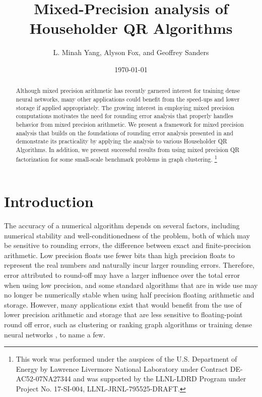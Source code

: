 \documentclass[review,onefignum,onetabnum]{siamart190516}
\title{Mixed-Precision analysis of Householder QR Algorithms}
\author{L. Minah Yang, Alyson Fox, and Geoffrey Sanders}
\date{\today}
\newcommand\blfootnote[1]{%
	\begingroup
	\renewcommand\thefootnote{}\footnote{#1}%
	\addtocounter{footnote}{-1}%
	\endgroup
}
\begin{document}
\maketitle
\begin{abstract}
	Although mixed precision arithmetic has recently garnered interest for training dense neural networks, many other applications could benefit from the  speed-ups and lower storage if applied appropriately. 
	The growing interest in employing mixed precision computations motivates the need for rounding error analysis that properly handles behavior from mixed precision arithmetic.
	We present a framework for mixed precision analysis that builds on the foundations of rounding error analysis presented in \cite{Higham2002} and demonstrate its practicality by applying the analysis to various Householder QR Algorithms. 
	In addition, we present successful results from using mixed precision QR factorization for some small-scale benchmark problems in graph clustering. 
	\blfootnote{This work was performed under the auspices of the U.S. Department of Energy by Lawrence Livermore National Laboratory under Contract DE-AC52-07NA27344 and was supported by the LLNL-LDRD Program under Project No. 17-SI-004, LLNL-JRNL-795525-DRAFT.}
\end{abstract}
\section{Introduction}
\label{sec:intro}
The accuracy of a numerical algorithm depends on several factors, including numerical stability and well-conditionedness of the problem, both of which may be sensitive to rounding errors, the difference between exact and finite-precision arithmetic. 
Low precision floats use fewer bits than high precision floats to represent the real numbers and naturally incur larger rounding errors. 
Therefore, error attributed to round-off may have a larger influence over the total error when using low precision, and some standard algorithms that are in wide use may no longer be numerically stable when using half precision floating arithmetic and storage. 
However, many applications exist that would benefit from the use of lower precision arithmetic and storage that are less sensitive to floating-point round off error, such as clustering or ranking graph algorithms \cite{vonLuxburg2007} or training dense neural networks \cite{micikevicius2018mixed}, to name a few.\par
\end{document}

